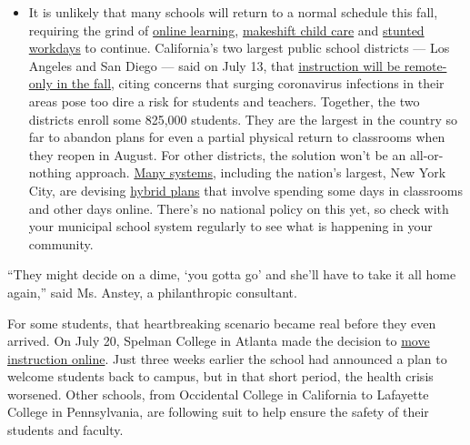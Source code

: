 \begin{itemize}
  \begin{itemize}
  \tightlist
  \item
    It is unlikely that many schools will return to a normal schedule
    this fall, requiring the grind of
    \href{https://www.nytimes3xbfgragh.onion/2020/06/05/us/coronavirus-education-lost-learning.html?action=click\&pgtype=Article\&state=default\&region=MAIN_CONTENT_3\&context=storylines_faq}{online
    learning},
    \href{https://www.nytimes3xbfgragh.onion/2020/05/29/us/coronavirus-child-care-centers.html?action=click\&pgtype=Article\&state=default\&region=MAIN_CONTENT_3\&context=storylines_faq}{makeshift
    child care} and
    \href{https://www.nytimes3xbfgragh.onion/2020/06/03/business/economy/coronavirus-working-women.html?action=click\&pgtype=Article\&state=default\&region=MAIN_CONTENT_3\&context=storylines_faq}{stunted
    workdays} to continue. California's two largest public school
    districts --- Los Angeles and San Diego --- said on July 13, that
    \href{https://www.nytimes3xbfgragh.onion/2020/07/13/us/lausd-san-diego-school-reopening.html?action=click\&pgtype=Article\&state=default\&region=MAIN_CONTENT_3\&context=storylines_faq}{instruction
    will be remote-only in the fall}, citing concerns that surging
    coronavirus infections in their areas pose too dire a risk for
    students and teachers. Together, the two districts enroll some
    825,000 students. They are the largest in the country so far to
    abandon plans for even a partial physical return to classrooms when
    they reopen in August. For other districts, the solution won't be an
    all-or-nothing approach.
    \href{https://bioethics.jhu.edu/research-and-outreach/projects/eschool-initiative/school-policy-tracker/}{Many
    systems}, including the nation's largest, New York City, are
    devising
    \href{https://www.nytimes3xbfgragh.onion/2020/06/26/us/coronavirus-schools-reopen-fall.html?action=click\&pgtype=Article\&state=default\&region=MAIN_CONTENT_3\&context=storylines_faq}{hybrid
    plans} that involve spending some days in classrooms and other days
    online. There's no national policy on this yet, so check with your
    municipal school system regularly to see what is happening in your
    community.
  \end{itemize}
\end{itemize}

``They might decide on a dime, `you gotta go' and she'll have to take it
all home again,'' said Ms. Anstey, a philanthropic consultant.

For some students, that heartbreaking scenario became real before they
even arrived. On July 20, Spelman College in Atlanta made the decision
to \href{https://www.spelman.edu/academics/path-forward-2020-21}{move
instruction online}. Just three weeks earlier the school had announced a
plan to welcome students back to campus, but in that short period, the
health crisis worsened. Other schools, from Occidental College in
California to Lafayette College in Pennsylvania, are following suit to
help ensure the safety of their students and faculty.

